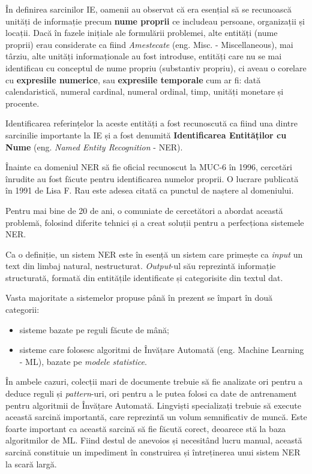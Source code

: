 În definirea sarcinilor IE, oamenii au observat că era esențial să se recunoască unități de informație precum \textbf{nume proprii} ce includeau persoane, organizații și locații. Dacă în fazele inițiale ale formulării problemei, alte entități (nume proprii) erau considerate ca fiind \textit{Amestecate} (eng. Misc. - Miscellaneous), mai târziu, alte unități informaționale au fost introduse, entități care nu se mai identificau cu conceptul de nume propriu (substantiv propriu), ci aveau o corelare cu \textbf{expresiile numerice}, sau \textbf{expresiile temporale} cum ar fi: dată calendaristică, numeral cardinal, numeral ordinal, timp, unități monetare și procente.


Identificarea referințelor la aceste entități a fost recunoscută ca fiind una dintre sarcinilie importante la IE și a fost denumită \textbf{Identificarea Entităților cu Nume} (eng. \textit{Named Entity Recognition} - NER).


Înainte ca domeniul NER să fie oficial recunoscut la MUC-6 în 1996, cercetări înrudite au fost făcute pentru identificarea numelor proprii. O lucrare publicată în 1991 de Lisa F. Rau este adesea citată ca punctul de naștere al domeniului.\cite{rau1991}

Pentru mai bine de 20 de ani, o comuniate de cercetători a abordat această problemă, folosind diferite tehnici și a creat soluții pentru a perfecționa sistemele NER.

Ca o definiție, un sistem NER este în esență un sistem care primește ca \textit{input} un text din limbaj natural, nestructurat. \textit{Output}-ul său reprezintă informație structurată, formată din entitățile identificate și categorisite din textul dat.

Vasta majoritate a sistemelor propuse până în prezent se împart în două categorii:

\begin{itemize}
\item sisteme bazate pe reguli făcute de mână;
\item sisteme care folosesc algoritmi de Învățare Automată (eng. Machine Learning - ML), bazate pe \textit{modele statistice}.
\end{itemize}


În ambele cazuri, colecții mari de documente trebuie să fie analizate ori pentru a deduce reguli și \textit{pattern}-uri, ori pentru a le putea folosi ca date  de antrenament pentru algoritmii de Învățare Automată. Lingviști specializați trebuie să execute această sarcină importantă, care reprezintă un volum semnificativ de muncă. Este foarte important ca această sarcină să fie făcută corect, deoarece stă la baza algoritmilor de ML. Fiind destul de anevoios și necesitând lucru manual, această sarcină constituie un impediment în construirea și întreținerea unui sistem NER la scară largă.

